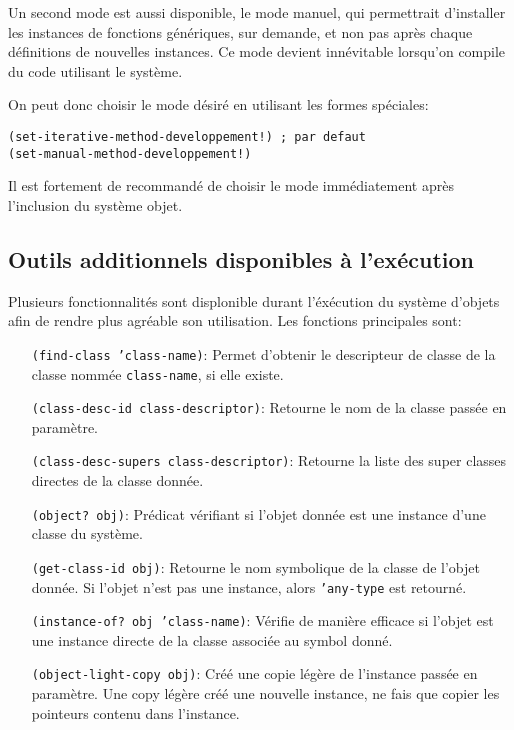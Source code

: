         Un second mode est aussi disponible, le mode manuel, qui
        permettrait d'installer les instances de fonctions génériques,
        sur demande, et non pas après chaque définitions de nouvelles
        instances. Ce mode devient innévitable lorsqu'on compile du
        code utilisant le système.

        On peut donc choisir le mode désiré en utilisant les formes
        spéciales:

        \begin{lstlisting}
(set-iterative-method-developpement!) ; par defaut
(set-manual-method-developpement!)
        \end{lstlisting}

        Il est fortement de recommandé de choisir le mode
        immédiatement après l'inclusion du système objet.

    \subsection{Outils additionnels disponibles à l'exécution}

      Plusieurs fonctionnalités sont displonible durant l'éxécution du
      système d'objets afin de rendre plus agréable son
      utilisation. Les fonctions principales sont:

      \begin{itemize}
      \item[\texttt{(find-class 'class-name)}:] Permet d'obtenir le
        descripteur de classe de la classe nommée
        \texttt{class-name}, si elle existe.
      \item[]
      \item[\texttt{(class-desc-id class-descriptor)}:] Retourne le
        nom de la classe passée en paramètre.
      \item[]
      \item[\texttt{(class-desc-supers class-descriptor)}:] Retourne
        la liste des super classes directes de la classe donnée.
      \item[]
      \item[\texttt{(object? obj)}:] Prédicat vérifiant si l'objet
        donnée est une instance d'une classe du système.
      \item[]
      \item[\texttt{(get-class-id obj)}:] Retourne le nom symbolique
        de la classe de l'objet donnée. Si l'objet n'est pas une
        instance, alors \texttt{'any-type} est retourné.
      \item[]
      \item[\texttt{(instance-of? obj 'class-name)}:] Vérifie de
        manière efficace si l'objet est une instance directe de la
        classe associée au symbol donné.
      \item[]
      \item[\texttt{(object-light-copy obj)}:] Créé une copie légère
        de l'instance passée en paramètre. Une copy légère créé une
        nouvelle instance, ne fais que copier les pointeurs contenu
        dans l'instance.
      \end{itemize}


